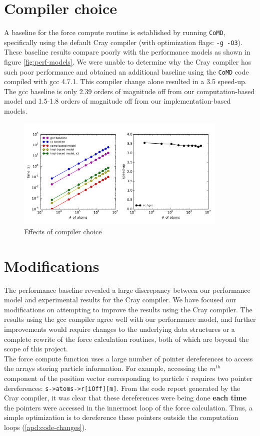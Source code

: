 \documentclass[12pt]{article}
\begin{document}
\section{Compiler choice}
A baseline for the force compute routine is established by running \texttt{CoMD}, 
specifically using the default Cray compiler (with optimization flags: \texttt{-g -O3}).
These baseline results compare poorly with the performance models 
as shown in figure \ref{fig:perf-models}. We were unable to determine why the Cray
compiler has such poor performance and obtained an additional baseline using
the \texttt{CoMD} code compiled with gcc 4.7.1. This compiler change alone
resulted in a 3.5 speed-up. The gcc baseline is only 2.39 orders of magnitude
off from our computation-based model and 1.5-1.8 orders of magnitude off
from our implementation-based models.

\begin{figure}[h!]
  \centering
  \includegraphics[width=0.9\textwidth]{../figs/compiler_forceLJ.pdf}
  \caption{Effects of compiler choice}
\end{figure}

\section{Modifications}
\label{sec:mods}
The performance baseline revealed a large discrepancy between our
performance model and experimental results for the Cray compiler. We
have focused our modifications on attempting to improve the results
using the Cray compiler. The results using the gcc compiler agree well
with our performance model, and further improvements would require
changes to the underlying data structures or a complete rewrite of the
force calculation routines, both of which are beyond the scope of this
project. \\

\noindent The force compute function uses a large number of pointer dereferences
to access the arrays storing particle information. For example, accessing the $m^{th}$ 
component of the position vector corresponding to particle $i$ requires two pointer 
dereferences: \texttt{s->atoms->r[iOff][m]}. From the code report generated by the Cray 
compiler, it was clear that these dereferences were being done {\bf each time} the
pointers were accessed in the innermost loop of the force calculation. 
Thus, a simple optimization is to dereference these pointers outside the computation 
loops (\ref{apd:code-changes}). \\
\end{document}
